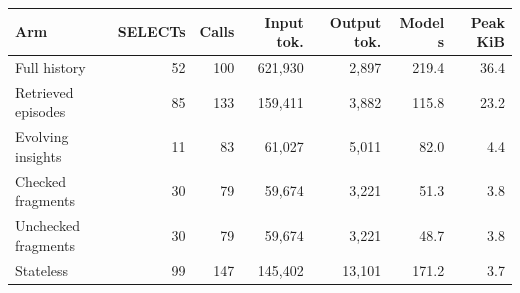 \begin{tabular}{lrrrrrr}
\toprule
Arm & SELECTs & Calls & Input tok. & Output tok. & Model s & Peak KiB \\
\midrule
Full history & 52 & 100 & 621,930 & 2,897 & 219.4 & 36.4 \\
Retrieved episodes & 85 & 133 & 159,411 & 3,882 & 115.8 & 23.2 \\
Evolving insights & 11 & 83 & 61,027 & 5,011 & 82.0 & 4.4 \\
Checked fragments & 30 & 79 & 59,674 & 3,221 & 51.3 & 3.8 \\
Unchecked fragments & 30 & 79 & 59,674 & 3,221 & 48.7 & 3.8 \\
Stateless & 99 & 147 & 145,402 & 13,101 & 171.2 & 3.7 \\
\bottomrule
\end{tabular}
